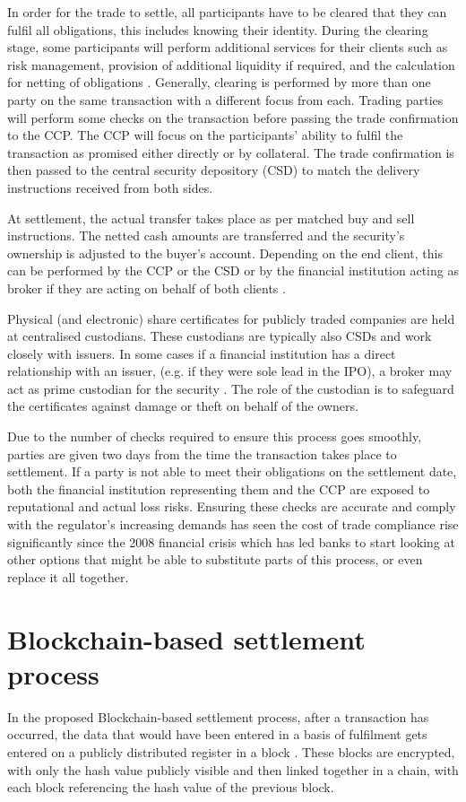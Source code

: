 \documentclass{article}
\begin{document}
In order for the trade to settle, all participants have to be cleared that they can fulfil all obligations, this includes knowing their identity. During the clearing stage, some participants will perform additional services for their clients such as risk management, provision of additional liquidity if required, and the calculation for netting of obligations \cite{CCP}. Generally, clearing is performed by more than one party on the same transaction with a different focus from each. Trading parties will perform some checks on the transaction before passing the trade confirmation to the CCP. The CCP will focus on the participants' ability to fulfil the transaction as promised either directly or by collateral. The trade confirmation is then passed to the central security depository (CSD) to match the delivery instructions received from both sides.

At settlement, the actual transfer takes place as per matched buy and sell instructions. The netted cash amounts are transferred and the security's ownership is adjusted to the buyer's account. Depending on the end client, this can be performed by the CCP or the CSD or by the financial institution acting as broker if they are acting on behalf of both clients \cite{CCP}.

Physical (and electronic) share certificates for publicly traded companies are held at centralised custodians. These custodians are typically also CSDs and work closely with issuers. In some cases if a financial institution has a direct relationship with an issuer, (e.g. if they were sole lead in the IPO), a broker may act as prime custodian for the security \cite{CCP}. The role of the custodian is to safeguard the certificates against damage or theft on behalf of the owners.

Due to the number of checks required to ensure this process goes smoothly, parties are given two days from the time the transaction takes place to settlement. If a party is not able to meet their obligations on the settlement date, both the financial institution representing them and the CCP are exposed to reputational and actual loss risks. Ensuring these checks are accurate and comply with the regulator's increasing demands has seen the cost of trade compliance rise significantly \cite{TradeRisk} since the 2008 financial crisis which has led banks to start looking at other options that might be able to substitute parts of this process, or even replace it all together.


\section{Blockchain-based settlement process}
In the proposed Blockchain-based settlement process, after a transaction has occurred, the data that would have been entered in a basis of fulfilment gets entered on a publicly distributed register in a block \cite{CaytasCU}. These blocks are encrypted, with only the hash value publicly visible and then linked together in a chain, with each block referencing the hash value of the previous block.
\end{document}
